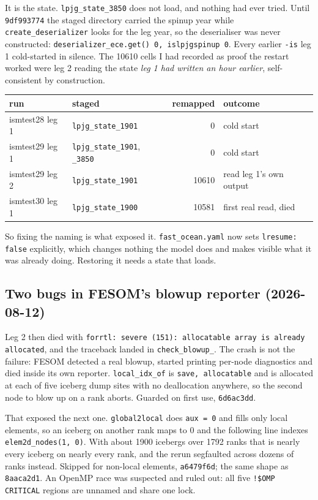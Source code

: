 \documentclass[11pt,a4paper]{article}
\newcommand{\code}[1]{\texttt{\small #1}}
\begin{document}
It is the state. \code{lpjg\_state\_3850} does not load, and nothing had ever tried. Until
\code{9df993774} the staged directory carried the spinup year while \code{create\_deserializer}
looks for the leg year, so the deserialiser was never constructed:
\code{deserializer\_ece.get() 0, islpjgspinup 0}. Every earlier \code{-is} leg 1 cold-started in
silence. The 10610 cells I had recorded as proof the restart worked were leg 2 reading the state
\emph{leg 1 had written an hour earlier}, self-consistent by construction.

\begin{center}
\begin{tabular}{llrl}
\toprule
run & staged & remapped & outcome \\
\midrule
ismtest28 leg 1 & \code{lpjg\_state\_1901} & 0 & cold start \\
ismtest29 leg 1 & \code{lpjg\_state\_1901}, \code{\_3850} & 0 & cold start \\
ismtest29 leg 2 & \code{lpjg\_state\_1901} & 10610 & read leg 1's own output \\
ismtest30 leg 1 & \code{lpjg\_state\_1900} & 10581 & first real read, died \\
\bottomrule
\end{tabular}
\end{center}

So fixing the naming is what exposed it. \code{fast\_ocean.yaml} now sets
\code{lresume: false} explicitly, which changes nothing the model does and makes visible what it
was already doing. Restoring it needs a state that loads.

\subsection{Two bugs in FESOM's blowup reporter (2026-08-12)}

Leg 2 then died with \code{forrtl: severe (151): allocatable array is already allocated}, and the
traceback landed in \code{check\_blowup\_}. The crash is not the failure: FESOM detected a real
blowup, started printing per-node diagnostics and died inside its own reporter.
\code{local\_idx\_of} is \code{save, allocatable} and is allocated at each of five iceberg dump
sites with no deallocation anywhere, so the second node to blow up on a rank aborts. Guarded on
first use, \code{6d6ac3dd}.

That exposed the next one. \code{global2local} does \code{aux = 0} and fills only local elements,
so an iceberg on another rank maps to 0 and the following line indexes \code{elem2d\_nodes(1, 0)}.
With about 1900 icebergs over 1792 ranks that is nearly every iceberg on nearly every rank, and
the rerun segfaulted across dozens of ranks instead. Skipped for non-local elements,
\code{a6479f6d}; the same shape as \code{8aaca2d1}. An OpenMP race was suspected and ruled out:
all five \code{!\$OMP CRITICAL} regions are unnamed and share one lock.
\end{document}
